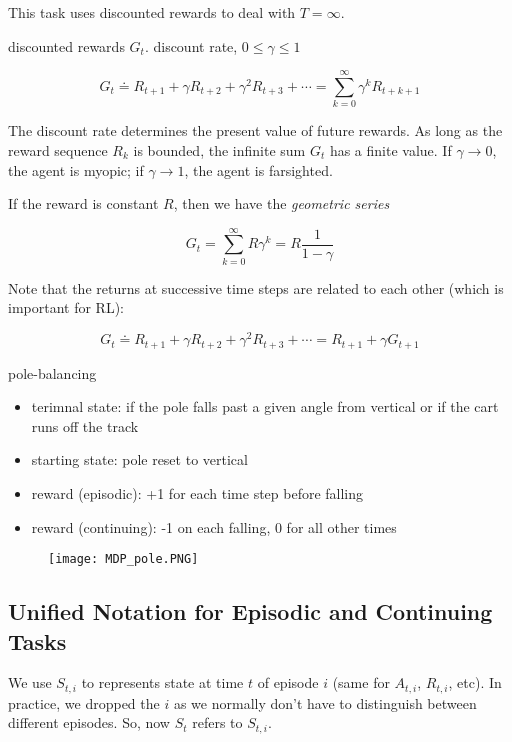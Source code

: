 \documentclass[lang=en,mode=geye,device=normal,color=blue,14pt]{elegantnote}
\DeclareMathOperator*{\1}{\mathbbm{1}}
\begin{document}
This task uses discounted rewards to deal with $T=\infty$.

\begin{definition}
discounted rewards $G_t$. discount rate, $0 \leq \gamma \leq 1$

$$ G_t \doteq R_{t+1} + \gamma R_{t+2} + \gamma^2 R_{t+3} + \cdots = \sum_{k=0}^{\infty} \gamma^k R_{t+k+1} $$
\end{definition}

The discount rate determines the present value of future rewards. As long as the reward sequence {$R_k$} is bounded, the infinite sum $G_t$ has a finite value.
If $\gamma \rightarrow 0$, the agent is myopic; if $\gamma \rightarrow 1$, the agent is farsighted.

If the reward is constant $R$, then we have the \textit{geometric series}

$$ G_t = \sum_{k=0}^{\infty} R\gamma^k = R\frac{1}{1-\gamma} $$

Note that the returns at successive time steps are related to each other (which is important for RL):

$$ G_t \doteq R_{t+1} + \gamma R_{t+2} + \gamma^2 R_{t+3} + \cdots = R_{t+1} + \gamma G_{t+1} $$

\begin{example} pole-balancing
\begin{itemize}
\item terimnal state: if the pole falls past a given angle from vertical or if the cart runs off the track
\item starting state: pole reset to vertical
\item reward (episodic): +1 for each time step before falling
\item reward (continuing): -1 on each falling, 0 for all other times
\end{itemize}
\end{example}


\begin{figure}[!h]
  \texttt{[image: MDP\_pole.PNG]}
  \label{fig:MDP_pole}
\end{figure}



\subsection{Unified Notation for Episodic and Continuing Tasks}

We use $S_{t,i}$ to represents state at time $t$ of episode $i$ (same for $A_{t,i}$, $R_{t,i}$, etc).
In practice, we dropped the $i$ as we normally don't have to distinguish between different episodes.
So, now $S_t$ refers to $S_{t,i}$.
\end{document}
